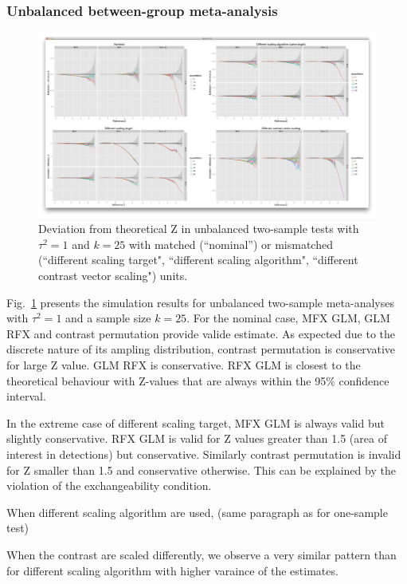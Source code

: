 \documentclass{llncs}
\newcommand{\nStudies}{k}
\newcommand{\varBetween}{\tau^2}
\begin{document}
\subsubsection{Unbalanced between-group meta-analysis}

\begin{figure}[t]
	\centering
	\includegraphics[width=0.99\linewidth]{./figures/test3_k25_btw1.png}
	\caption{Deviation from theoretical Z in unbalanced two-sample tests with $\varBetween=1$ and $\nStudies = 25$ with matched (``nominal'') or mismatched (``different scaling target", ``different scaling algorithm", ``different contrast vector scaling") units.}
	\label{test2_k25_btw1}
\end{figure}

Fig.~\ref{test2_k25_btw1} presents the simulation results for unbalanced two-sample meta-analyses with $\varBetween=1$ and a sample size $\nStudies = 25$. For the nominal case, MFX GLM, GLM RFX and contrast permutation provide valide estimate. As expected due to the discrete nature of its ampling distribution, contrast permutation is conservative for large Z value. GLM RFX is conservative. RFX GLM is closest to the theoretical behaviour with Z-values that are always within the 95\% confidence interval.

In the extreme case of different scaling target, MFX GLM is always valid but slightly conservative. RFX GLM is valid for Z values greater than 1.5 (area of interest in detections) but conservative. Similarly contrast permutation is invalid for Z smaller than 1.5 and conservative otherwise. This can be explained by the violation of the exchangeability condition.

When different scaling algorithm are used, (same paragraph as for one-sample test)

When the contrast are scaled differently, we observe a very similar pattern than for different scaling algorithm with higher varaince of the estimates.
\end{document}
